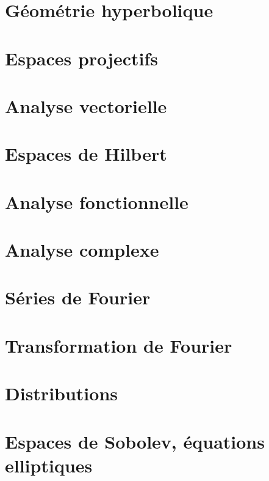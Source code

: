 \documentclass[a4paper,twoside,11pt]{book}
\begin{document}
\chapter{Géométrie hyperbolique}


\chapter{Espaces projectifs}




\chapter{Analyse vectorielle}


\chapter{Espaces de Hilbert}


\chapter{Analyse fonctionnelle}



\chapter{Analyse complexe}          \label{ChapICHIooXbLccl}



\chapter{Séries de Fourier}


\chapter{Transformation de Fourier}


\chapter{Distributions}


\chapter{Espaces de Sobolev, équations elliptiques}      \label{CHAPooVTIIooGOEvXT}

\end{document}

